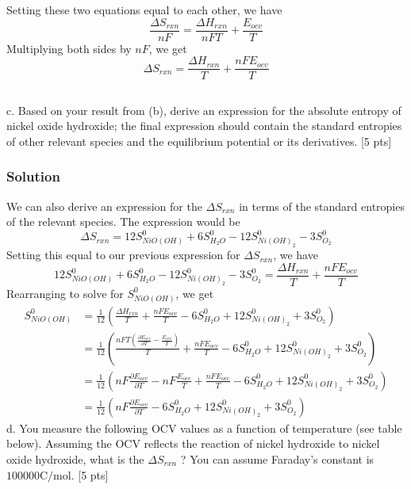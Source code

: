 \documentclass[12pt]{article}
\begin{document}
Setting these two equations equal to each other, we have
\begin{equation}
    \frac{\Delta S_{rxn}}{nF} = \frac{\Delta H_{rxn}}{nFT} + \frac{E_{ocv}}{T}
\end{equation}
Multiplying both sides by $nF$, we get
\begin{equation}
    \Delta S_{rxn} = \frac{\Delta H_{rxn}}{T} + \frac{nFE_{ocv}}{T}
\end{equation}
\subsection{}
c. Based on your result from (b), derive an expression for the absolute entropy of nickel oxide hydroxide; the final expression should contain the standard entropies of other relevant species and the equilibrium potential or its derivatives. [5 pts]\\
\subsubsection{Solution}
We can also derive an expression for the $\Delta S_{rxn}$ in terms of the standard entropies of the relevant species. The expression would be
\begin{equation}
    \Delta S_{rxn} = 12S^0_{NiO(OH)} + 6S^0_{H_2O} - 12S^0_{Ni(OH)_2} - 3S^0_{O_2}
\end{equation}
Setting this equal to our previous expression for $\Delta S_{rxn}$, we have
\begin{equation}
    12S^0_{NiO(OH)} + 6S^0_{H_2O} - 12S^0_{Ni(OH)_2} - 3S^0_{O_2} = \frac{\Delta H_{rxn}}{T} + \frac{nFE_{ocv}}{T}
\end{equation}
Rearranging to solve for $S^0_{NiO(OH)}$, we get
\begin{align}
    S^0_{NiO(OH)} &= \frac{1}{12} \left( \frac{\Delta H_{rxn}}{T} + \frac{nFE_{ocv}}{T} - 6S^0_{H_2O} + 12S^0_{Ni(OH)_2} + 3S^0_{O_2} \right) \\
    &= \frac{1}{12} \left( \frac{nFT \left( \frac{\partial E_{ocv}}{\partial T} - \frac{E_{ocv}}{T} \right)}{T} + \frac{nFE_{ocv}}{T} - 6S^0_{H_2O} + 12S^0_{Ni(OH)_2} + 3S^0_{O_2} \right) \\
    &= \frac{1}{12} \left( nF \frac{\partial E_{ocv}}{\partial T} - nF \frac{E_{ocv}}{T} + \frac{nFE_{ocv}}{T} - 6S^0_{H_2O} + 12S^0_{Ni(OH)_2} + 3S^0_{O_2} \right) \\
    &= \frac{1}{12} \left( nF \frac{\partial E_{ocv}}{\partial T} - 6S^0_{H_2O} + 12S^0_{Ni(OH)_2} + 3S^0_{O_2} \right)
\end{align}
d. You measure the following OCV values as a function of temperature (see table below). Assuming the OCV reflects the reaction of nickel hydroxide to nickel oxide hydroxide, what is the $\Delta S_{r x n}$ ? You can assume Faraday's constant is $100000 \mathrm{C} / \mathrm{mol}$. [5 pts]
\end{document}
